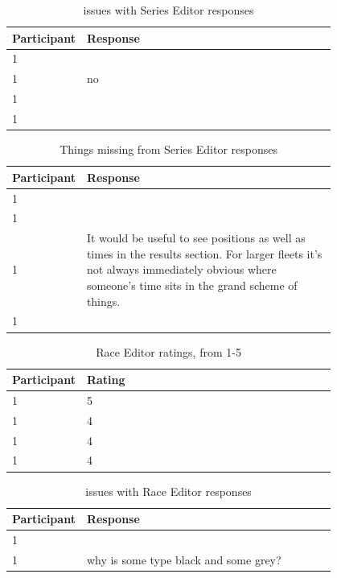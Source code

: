 \documentclass{l4proj}
\begin{document}
\begin{appendices}
\begin{table}[!ht]
    \caption{issues with Series Editor responses}
    \begin{tabular}{|l|p{0.8\linewidth}|}
    \hline
        \textbf{Participant} & \textbf{Response}  \\ \hline
        1 &   \\ \hline
        1 & no  \\ \hline
        1 &   \\ \hline
        1 &   \\ \hline
    \end{tabular}
\end{table}
\begin{table}[!ht]
    \centering
    \caption{Things missing from Series Editor responses}
    \begin{tabular}{|l|p{0.8\linewidth}|}
    \hline
        \textbf{Participant} & \textbf{Response}  \\ \hline
        1 &   \\ \hline
        1 &   \\ \hline
        1 & It would be useful to see positions as well as times in the results section. For larger fleets it's not always immediately obvious where someone's time sits in the grand scheme of things.  \\ \hline
        1 &   \\ \hline
    \end{tabular}
\end{table}
\begin{table}[!ht]
    \centering
    \caption{Race Editor ratings, from 1-5}
    \begin{tabular}{|l|p{0.8\linewidth}|}
    \hline
        \textbf{Participant} & \textbf{Rating}  \\ \hline
        1 & 5  \\ \hline
        1 & 4  \\ \hline
        1 & 4  \\ \hline
        1 & 4  \\ \hline
    \end{tabular}
\end{table}
\begin{table}[!ht]
    \centering
    \caption{issues with Race Editor responses}
    \begin{tabular}{|l|p{0.8\linewidth}|}
    \hline
        \textbf{Participant} & \textbf{Response}  \\ \hline
        1 &   \\ \hline
        1 & why is some type black and some grey?  \\ \hline

\end{tabular}
\end{table}
\end{appendices}
\end{document}
